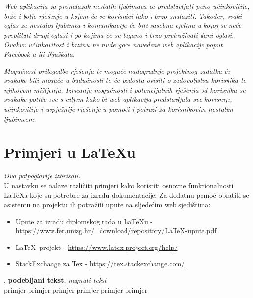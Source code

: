 		\textit{Web aplikacija za pronalazak nestalih ljubimaca će predstavljati puno učinkovitije, brže i bolje rješenje u kojem će se korisnici lako i brzo snalaziti. Također, svaki oglas za nestalog ljubimca i komunikacija će biti zasebna cjelina u kojoj se neće preplitati drugi oglasi i po kojima će se lagano i brzo pretraživati dani oglasi. Ovakvu učinkovitost i brzinu ne nude gore navedene web aplikacije poput Facebook-a ili Njuškala.}
		
		\textit{Mogućnost prilagodbe rješenja te moguće nadogradnje projektnog zadatka će svakako biti moguće u budućnosti te će podosta ovisiti o zadovoljstvu korisnika te njihovom mišljenju. Izricanje mogućnosti i potencijalnih rješenja od korisnika se svakako potiče sve s ciljem kako bi web aplikacija predstavljala sve korisnije, učinkovitije i uspješnije rješenje u pomoći i potrazi za korisnikovim nestalim ljubimcem.}
		
		\eject
		
		
		
		\section{Primjeri u \LaTeX u}
		
		\textit{Ovo potpoglavlje izbrisati.}\\

		U nastavku se nalaze različiti primjeri kako koristiti osnovne funkcionalnosti \LaTeX a koje su potrebne za izradu dokumentacije. Za dodatnu pomoć obratiti se asistentu na projektu ili potražiti upute na sljedećim web sjedištima:
		\begin{itemize}
			\item Upute za izradu diplomskog rada u \LaTeX u - \url{https://www.fer.unizg.hr/_download/repository/LaTeX-upute.pdf}
			\item \LaTeX\ projekt - \url{https://www.latex-project.org/help/}
			\item StackExchange za Tex - \url{https://tex.stackexchange.com/}\\
		
		\end{itemize} 	


		
		\noindent {}, \textbf{podebljani tekst}, 	\textit{nagnuti tekst}\\
		\noindent \normalsize primjer \large primjer \Large primjer \LARGE {primjer} \huge {primjer} \Huge primjer \normalsize
				
